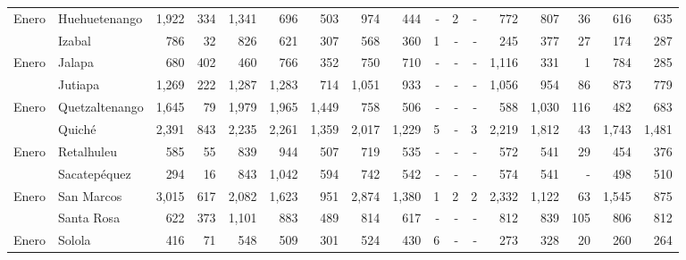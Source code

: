 \begin{landscape}
\begin{center}
\begin{longtable}{llrrrrrrrrrrrrrrr}
			\multicolumn{1}{l}{	\footnotesize	 Enero 	}&	 Huehuetenango 	&	 1,922 	&	 334 	&	 1,341 	&	 696 	&	 503 	&	 974 	&	 444 	&	 -   	&	 2 	&	 -   	&	 772 	&	 807 	&	 36 	&	 616 	&	 635 	\\
			\rowcolor{color1!5!white}\multicolumn{1}{l}{	\footnotesize	 Enero 	}&	 Izabal 	&	 786 	&	 32 	&	 826 	&	 621 	&	 307 	&	 568 	&	 360 	&	 1 	&	 -   	&	 -   	&	 245 	&	 377 	&	 27 	&	 174 	&	 287 	\\
			\multicolumn{1}{l}{	\footnotesize	 Enero 	}&	 Jalapa 	&	 680 	&	 402 	&	 460 	&	 766 	&	 352 	&	 750 	&	 710 	&	 -   	&	 -   	&	 -   	&	 1,116 	&	 331 	&	 1 	&	 784 	&	 285 	\\
			\rowcolor{color1!5!white}\multicolumn{1}{l}{	\footnotesize	 Enero 	}&	 Jutiapa 	&	 1,269 	&	 222 	&	 1,287 	&	 1,283 	&	 714 	&	 1,051 	&	 933 	&	 -   	&	 -   	&	 -   	&	 1,056 	&	 954 	&	 86 	&	 873 	&	 779 	\\
			\multicolumn{1}{l}{	\footnotesize	 Enero 	}&	 Quetzaltenango 	&	 1,645 	&	 79 	&	 1,979 	&	 1,965 	&	 1,449 	&	 758 	&	 506 	&	 -   	&	 -   	&	 -   	&	 588 	&	 1,030 	&	 116 	&	 482 	&	 683 	\\
			\rowcolor{color1!5!white}\multicolumn{1}{l}{	\footnotesize	 Enero 	}&	 Quiché 	&	 2,391 	&	 843 	&	 2,235 	&	 2,261 	&	 1,359 	&	 2,017 	&	 1,229 	&	 5 	&	 -   	&	 3 	&	 2,219 	&	 1,812 	&	 43 	&	 1,743 	&	 1,481 	\\
			\multicolumn{1}{l}{	\footnotesize	 Enero 	}&	 Retalhuleu 	&	 585 	&	 55 	&	 839 	&	 944 	&	 507 	&	 719 	&	 535 	&	 -   	&	 -   	&	 -   	&	 572 	&	 541 	&	 29 	&	 454 	&	 376 	\\
			\rowcolor{color1!5!white}\multicolumn{1}{l}{	\footnotesize	 Enero 	}&	 Sacatepéquez 	&	 294 	&	 16 	&	 843 	&	 1,042 	&	 594 	&	 742 	&	 542 	&	 -   	&	 -   	&	 -   	&	 574 	&	 541 	&	 -   	&	 498 	&	 510 	\\
			\multicolumn{1}{l}{	\footnotesize	 Enero 	}&	 San Marcos 	&	 3,015 	&	 617 	&	 2,082 	&	 1,623 	&	 951 	&	 2,874 	&	 1,380 	&	 1 	&	 2 	&	 2 	&	 2,332 	&	 1,122 	&	 63 	&	 1,545 	&	 875 	\\
			\rowcolor{color1!5!white}\multicolumn{1}{l}{	\footnotesize	 Enero 	}&	 Santa Rosa 	&	 622 	&	 373 	&	 1,101 	&	 883 	&	 489 	&	 814 	&	 617 	&	 -   	&	 -   	&	 -   	&	 812 	&	 839 	&	 105 	&	 806 	&	 812 	\\
			\multicolumn{1}{l}{	\footnotesize	 Enero 	}&	 Solola 	&	 416 	&	 71 	&	 548 	&	 509 	&	 301 	&	 524 	&	 430 	&	 6 	&	 -   	&	 -   	&	 273 	&	 328 	&	 20 	&	 260 	&	 264 	\\

\end{longtable}
\end{center}
\end{landscape}
